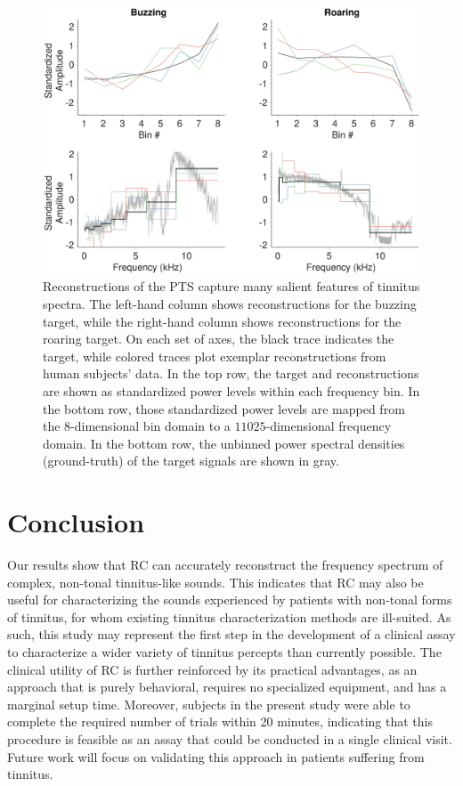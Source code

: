 \documentclass[journal]{IEEEtran}
\begin{document}
\begin{figure}[ht]
    \centering
    \includegraphics[width=\linewidth]{reconstruction_spectra.eps}
    \caption{Reconstructions of the PTS capture many salient features of tinnitus spectra.
    The left-hand column shows reconstructions for the buzzing target,
    while the right-hand column shows reconstructions for the roaring target.
    On each set of axes, the black trace indicates the target,
    while colored traces plot exemplar reconstructions from human subjects' data.
    In the top row, the target and reconstructions are shown as
    standardized power levels within each frequency bin.
    In the bottom row, those standardized power levels are mapped from the $8$-dimensional bin domain
    to a $11025$-dimensional frequency domain.
    In the bottom row, the unbinned power spectral densities (ground-truth) of the target signals are shown in gray.}
    \label{fig:spectra}
\end{figure}

\section{Conclusion}

Our results show that RC can accurately reconstruct the frequency spectrum of complex, non-tonal tinnitus-like sounds.
This indicates that RC may also be useful for characterizing the sounds experienced by patients with non-tonal forms of tinnitus,
for whom existing tinnitus characterization methods are ill-suited.
As such, this study may represent the first step in the development of a clinical assay to characterize a wider variety of tinnitus percepts than currently possible.
The clinical utility of RC is further reinforced by its practical advantages,
as an approach that is purely behavioral, requires no specialized equipment, and has a marginal setup time.
Moreover, subjects in the present study were able to complete the required number of trials within 20 minutes,
indicating that this procedure is feasible as an assay that could be conducted in a single clinical visit.
Future work will focus on validating this approach in patients suffering from tinnitus.
\end{document}
